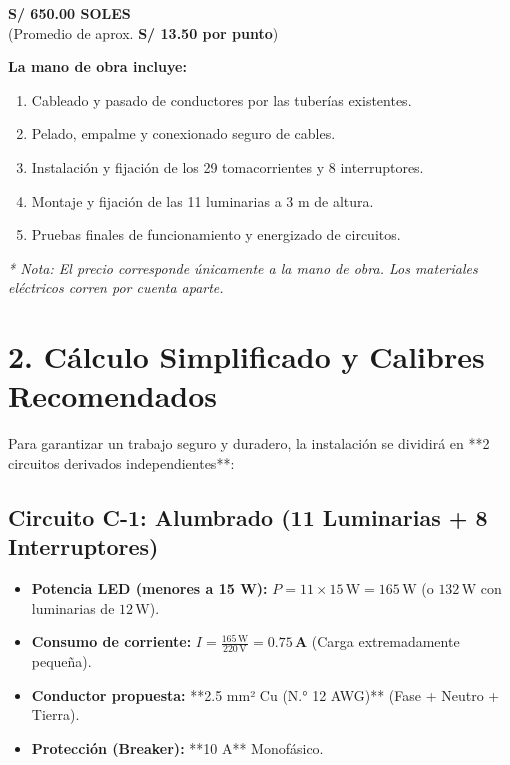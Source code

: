 \documentclass[11pt,a4paper]{article}
\begin{document}
\begin{tcolorbox}[colback=BgGrey,colframe=AccentBlue,title=\textbf{PRECIO Y CONDICIONES DE MANO DE OBRA}]
    \centering
    {\Huge \textbf{\color{GreenPrice} S/ 650.00 SOLES}}\\[0.2cm]
    \small (Promedio de aprox. \textbf{S/ 13.50 por punto})
    \tcblower
    \raggedright
    \textbf{La mano de obra incluye:}
    \begin{enumerate}
        \item Cableado y pasado de conductores por las tuberías existentes.
        \item Pelado, empalme y conexionado seguro de cables.
        \item Instalación y fijación de los 29 tomacorrientes y 8 interruptores.
        \item Montaje y fijación de las 11 luminarias a 3 m de altura.
        \item Pruebas finales de funcionamiento y energizado de circuitos.
    \end{enumerate}
    \textit{* Nota: El precio corresponde únicamente a la mano de obra. Los materiales eléctricos corren por cuenta aparte.}
\end{tcolorbox}

\section*{2. Cálculo Simplificado y Calibres Recomendados}

Para garantizar un trabajo seguro y duradero, la instalación se dividirá en **2 circuitos derivados independientes**:

\subsection*{Circuito C-1: Alumbrado (11 Luminarias + 8 Interruptores)}
\begin{itemize}
    \item \textbf{Potencia LED (menores a 15 W):} $P = 11 \times 15\,\text{W} = 165\,\text{W}$ (o $132\,\text{W}$ con luminarias de $12\,\text{W}$).
    \item \textbf{Consumo de corriente:} $I = \frac{165\,\text{W}}{220\,\text{V}} = \mathbf{0.75\,\text{A}}$ (Carga extremadamente pequeña).
    \item \textbf{Conductor propuesta:} **2.5 mm² Cu (N.° 12 AWG)** (Fase + Neutro + Tierra).
    \item \textbf{Protección (Breaker):} **10 A** Monofásico.
\end{itemize}
\end{document}
